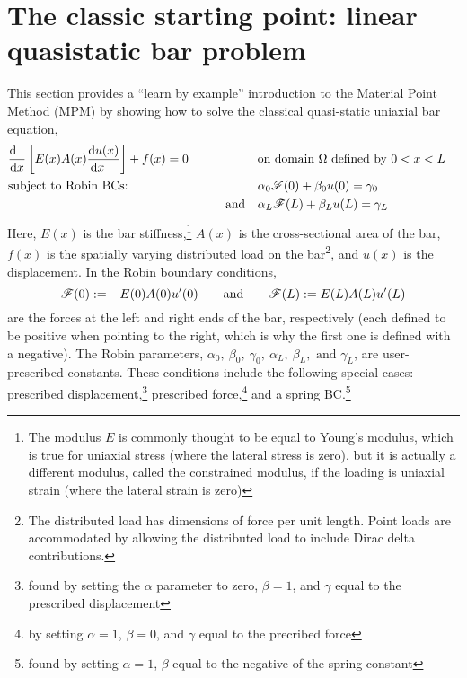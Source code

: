\section{The classic starting point: linear quasistatic \oneD bar problem}
This section provides a ``learn by example'' introduction to the Material Point Method (MPM) by showing how to solve the classical quasi-static uniaxial bar equation,
\begin{equation}
\begin{aligned}
  &\frac{\mathrm{d}~~}{\mathrm{d} x}\left[E(x)A(x) \frac{\mathrm{d} u(x)}{\mathrm{d} x~~~}\right]+f(x)=0 \qquad  &          &\text{on domain $\Omega$ defined by }0<x<L& \\
  &\text{subject to Robin BCs: }
       &&\alpha_0 \mathscr{F}(0)+\beta_0 u(0)=\gamma_0 \\
       &&\text{and ~~}&\alpha_L \mathscr{F}(L)+\beta_L u(L)=\gamma_L 
\end{aligned}
\label{eq:LinearBarStrongForm}
\end{equation}
Here, $E(x)$ is the bar stiffness,\footnote{The modulus $E$ is commonly thought to be equal to Young's modulus, which is true for uniaxial stress (where the lateral stress is zero), but it is actually a different modulus, called the constrained modulus, if the loading is uniaxial strain (where the lateral strain is zero)} 
%
$A(x)$ is the cross-sectional area of the bar, 
%
$f(x)$ is the spatially varying distributed load on the bar\footnote{The distributed load has dimensions of force per unit length. Point loads are accommodated by allowing the distributed load to include Dirac delta contributions.}, 
%
and $u(x)$ is the displacement.  
%
In the Robin boundary conditions, 
\begin{equation}
  \mathscr{F}(0):= -E(0)A(0)u'(0)
\qquad\text{and}\qquad
  \mathscr{F}(L):=  E(L)A(L)u'(L)
\label{eq:boundaryForces}
\end{equation}
are the forces at the left and right ends of the bar, respectively (each defined to be positive when pointing to the right, which is why the first one is defined with a negative). The Robin parameters, $\alpha_0,~\beta_0,~\gamma_0,~\alpha_L,~\beta_L, \text{ and } \gamma_L$, are user-prescribed constants. 
These conditions include the following special cases:
%
prescribed displacement,\footnote{found by setting the $\alpha$ parameter to zero, $\beta=1$, and $\gamma$ equal to the prescribed displacement}
%
prescribed force,\footnote{by setting $\alpha=1$, $\beta=0$, and $\gamma$ equal to the precribed force}
%
and a spring BC.\footnote{found by setting $\alpha=1$, $\beta$ equal to the negative of the spring constant}

